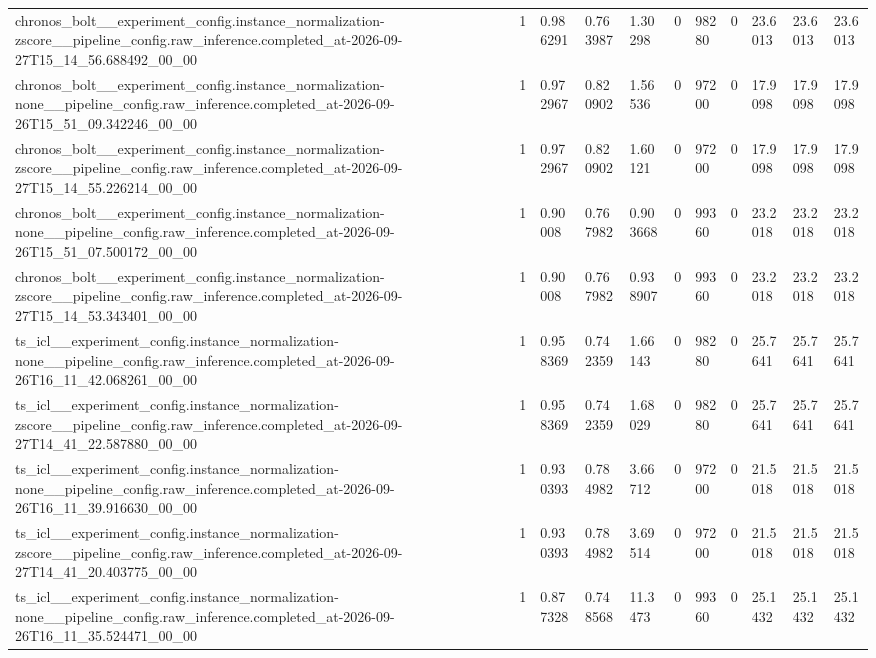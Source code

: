 \begin{tabular}{lllllllllll}
chronos\_bolt\_\_experiment\_config.instance\_normalization-zscore\_\_pipeline\_config.raw\_inference.completed\_at-2026-09-27T15\_14\_56.688492\_00\_00 & 1 & 0.986291 & 0.763987 & 1.30298 & 0 & 98280 & 0 & 23.6013 & 23.6013 & 23.6013 \\
chronos\_bolt\_\_experiment\_config.instance\_normalization-none\_\_pipeline\_config.raw\_inference.completed\_at-2026-09-26T15\_51\_09.342246\_00\_00 & 1 & 0.972967 & 0.820902 & 1.56536 & 0 & 97200 & 0 & 17.9098 & 17.9098 & 17.9098 \\
chronos\_bolt\_\_experiment\_config.instance\_normalization-zscore\_\_pipeline\_config.raw\_inference.completed\_at-2026-09-27T15\_14\_55.226214\_00\_00 & 1 & 0.972967 & 0.820902 & 1.60121 & 0 & 97200 & 0 & 17.9098 & 17.9098 & 17.9098 \\
chronos\_bolt\_\_experiment\_config.instance\_normalization-none\_\_pipeline\_config.raw\_inference.completed\_at-2026-09-26T15\_51\_07.500172\_00\_00 & 1 & 0.90008 & 0.767982 & 0.903668 & 0 & 99360 & 0 & 23.2018 & 23.2018 & 23.2018 \\
chronos\_bolt\_\_experiment\_config.instance\_normalization-zscore\_\_pipeline\_config.raw\_inference.completed\_at-2026-09-27T15\_14\_53.343401\_00\_00 & 1 & 0.90008 & 0.767982 & 0.938907 & 0 & 99360 & 0 & 23.2018 & 23.2018 & 23.2018 \\
ts\_icl\_\_experiment\_config.instance\_normalization-none\_\_pipeline\_config.raw\_inference.completed\_at-2026-09-26T16\_11\_42.068261\_00\_00 & 1 & 0.958369 & 0.742359 & 1.66143 & 0 & 98280 & 0 & 25.7641 & 25.7641 & 25.7641 \\
ts\_icl\_\_experiment\_config.instance\_normalization-zscore\_\_pipeline\_config.raw\_inference.completed\_at-2026-09-27T14\_41\_22.587880\_00\_00 & 1 & 0.958369 & 0.742359 & 1.68029 & 0 & 98280 & 0 & 25.7641 & 25.7641 & 25.7641 \\
ts\_icl\_\_experiment\_config.instance\_normalization-none\_\_pipeline\_config.raw\_inference.completed\_at-2026-09-26T16\_11\_39.916630\_00\_00 & 1 & 0.930393 & 0.784982 & 3.66712 & 0 & 97200 & 0 & 21.5018 & 21.5018 & 21.5018 \\
ts\_icl\_\_experiment\_config.instance\_normalization-zscore\_\_pipeline\_config.raw\_inference.completed\_at-2026-09-27T14\_41\_20.403775\_00\_00 & 1 & 0.930393 & 0.784982 & 3.69514 & 0 & 97200 & 0 & 21.5018 & 21.5018 & 21.5018 \\
ts\_icl\_\_experiment\_config.instance\_normalization-none\_\_pipeline\_config.raw\_inference.completed\_at-2026-09-26T16\_11\_35.524471\_00\_00 & 1 & 0.877328 & 0.748568 & 11.3473 & 0 & 99360 & 0 & 25.1432 & 25.1432 & 25.1432 \\

\end{tabular}
